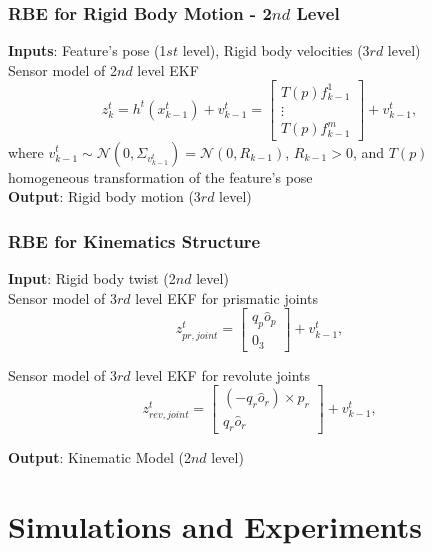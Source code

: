 \documentclass{beamer}
\begin{document}
\begin{frame}
\frametitle{RBE for Rigid Body Motion - 2$nd$ Level}
\textbf{Inputs}: Feature's pose (1$st$ level), Rigid body velocities (3$rd$ level) \\
\vspace{.4cm}
Sensor model of 2$nd$ level EKF 
\begin{equation}\label{obsMF}
z_k^t=h^t(x_{k-1}^t)+v_{k-1}^t= \begin{bmatrix}
T(p)f^1_{k-1} \\
\vdots \\
T(p)f^m_{k-1}
\end{bmatrix} + v_{k-1}^t,
\end{equation}
where $v_{k-1}^t \sim \mathcal{N}(0, \Sigma_{v_{k-1}^t})=\mathcal{N}(0, R_{k-1})$,  $R_{k-1}>0$, and $T(p)$ homogeneous transformation of the feature's pose\\
\vspace{.4cm}
\textbf{Output}: Rigid body motion (3$rd$ level)
\end{frame}

\begin{frame}
\frametitle{RBE for Kinematics Structure}
\textbf{Input}: Rigid body twist (2$nd$ level) \\
\vspace{.4cm}
Sensor model of 3$rd$ level EKF for prismatic joints
\begin{equation}
z_{pr, joint}^t=\begin{bmatrix}
q_p \hat{o}_p\\
0_3 
\end{bmatrix} + v_{k-1}^t,
\end{equation}

\vspace{.2cm}
Sensor model of 3$rd$ level EKF for revolute joints
\begin{equation}
z_{rev, joint}^t=\begin{bmatrix}
(-q_r \hat{o}_r) \times p_r\\
q_r \hat{o}_r
\end{bmatrix} + v_{k-1}^t,
\end{equation}

\vspace{.4cm}
\textbf{Output}: Kinematic Model (2$nd$ level)
\end{frame}
\section{Simulations and Experiments}
\end{document}
